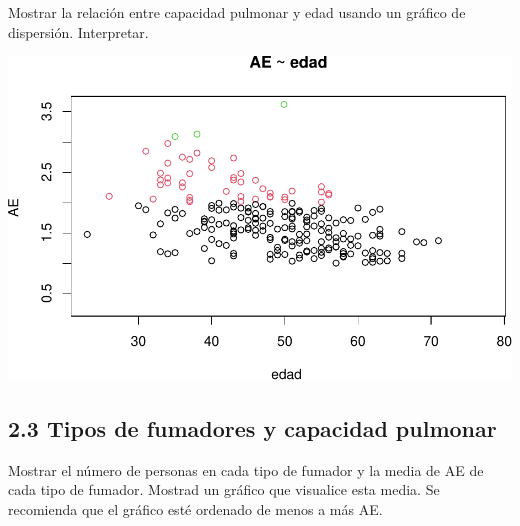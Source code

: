 \documentclass[
]{article}
\newenvironment{Shaded}{\begin{snugshade}}{\end{snugshade}}
\newcommand{\AttributeTok}[1]{\textcolor[rgb]{0.77,0.63,0.00}{#1}}
\newcommand{\FunctionTok}[1]{\textcolor[rgb]{0.00,0.00,0.00}{#1}}
\newcommand{\NormalTok}[1]{#1}
\newcommand{\SpecialCharTok}[1]{\textcolor[rgb]{0.00,0.00,0.00}{#1}}
\newcommand{\StringTok}[1]{\textcolor[rgb]{0.31,0.60,0.02}{#1}}
\begin{document}
\vspace{0.3cm}

Mostrar la relación entre capacidad pulmonar y edad usando un gráfico de
dispersión. Interpretar.

\vspace{0.3cm}

\begin{Shaded}
\end{Shaded}

\includegraphics{A4_files/figure-latex/unnamed-chunk-19-1.pdf}

\hypertarget{tipos-de-fumadores-y-capacidad-pulmonar}{%
\subsection{2.3 Tipos de fumadores y capacidad
pulmonar}\label{tipos-de-fumadores-y-capacidad-pulmonar}}

\vspace{0.3cm}

Mostrar el número de personas en cada tipo de fumador y la media de AE
de cada tipo de fumador. Mostrad un gráfico que visualice esta media. Se
recomienda que el gráfico esté ordenado de menos a más AE.

\vspace{0.3cm}
\end{document}
